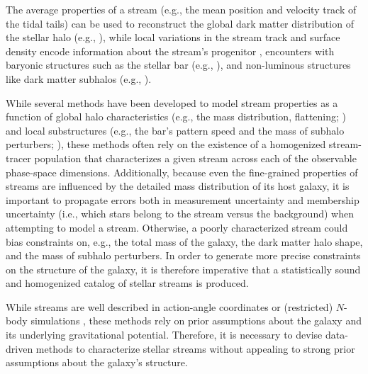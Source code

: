 \documentclass[twocolumn]{aastex631}
\begin{document}
    The average properties of a stream (e.g., the mean position and velocity
    track of the tidal tails) can be used to reconstruct the global dark matter
    distribution of the stellar halo (e.g., \citealt{Johnston+1999, Bonaca+2014,
    Bovy2014, Bovy+2016, Nibauer+2022, Koposov+2023}), while local variations in
    the stream track and surface density encode information about the stream's
    progenitor \citep{Kupper+2012, Sanders+2013, Price-Whelan+2014}, encounters
    with baryonic structures such as the stellar bar (e.g., \citealt{Erkal+2017,
    Pearson+2017}), and non-luminous structures like dark matter subhalos (e.g.,
    \citealt{Ibata+2002, Johnston+2002, Carlberg+2012-74820C, Bovy+2017,
    Bonaca+2019, Hermans+2021}).

    While several methods have been developed to model stream properties as a
    function of global halo characteristics (e.g., the mass distribution,
    flattening; \citealt{Johnston+1999, Binney2008, Koposov+2010,
    SandersBinney2013, Bovy2014, Nibauer+2022}) and local substructures (e.g.,
    the bar's pattern speed and the mass of subhalo perturbers;
    \citealt{Antoja+2014, Hattori+2016, Price-Whelan+2016, Bovy+2017,
    Pearson+2017, Bonaca+2019}), these methods often rely on the existence of a
    homogenized stream-tracer population that characterizes a given stream
    across each of the observable phase-space dimensions.  Additionally, because
    even the fine-grained properties of streams are influenced by the detailed
    mass distribution of its host galaxy, it is important to propagate errors
    both in measurement uncertainty and membership uncertainty (i.e., which
    stars belong to the stream versus the background) when attempting to model a
    stream. Otherwise, a poorly characterized stream could bias constraints on,
    e.g., the total mass of the galaxy, the dark matter halo shape, and the mass
    of subhalo perturbers.  In order to generate more precise constraints on the
    structure of the galaxy, it is therefore imperative that a statistically
    sound and homogenized catalog of stellar streams is produced. 

    While streams are well described in action-angle coordinates
    \citep[e.g.][]{Bovy2014} or (restricted) $N$-body simulations
    \citep[e.g.][]{Dehnen+2004}, these methods rely on prior assumptions about
    the galaxy and its underlying gravitational potential.  Therefore, it is
    necessary to devise data-driven methods to characterize stellar streams
    without appealing to strong prior assumptions about the galaxy's structure. 
    
\end{document}
